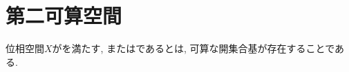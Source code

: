\documentclass[uplatex, dvipdfmx, a4paper, 12pt, class=jsbook, crop=false]{standalone}
\begin{document}
\section{第二可算空間}
\label{sec:second-countable-spaces}

\begin{definition}
	位相空間$ X $がを満たす,
	またはであるとは,
	可算な開集合基が存在することである.
\end{definition}
\end{document}
